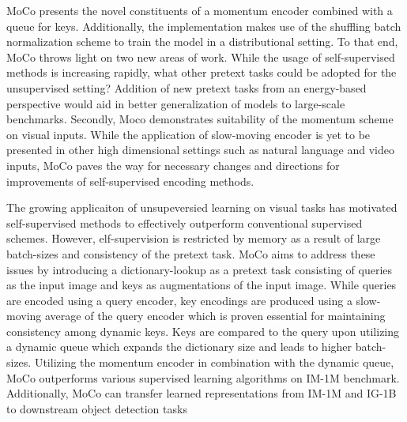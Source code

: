 \documentclass[10pt,letterpaper]{article}
\begin{document}
MoCo presents the novel constituents of a momentum encoder combined with a queue for keys. Additionally, the implementation makes use of the shuffling batch normalization scheme to train the model in a distributional setting. To that end, MoCo throws light on two new areas of work. While the usage of self-supervised methods is increasing rapidly, what other pretext tasks could be adopted for the unsupervised setting? Addition of new pretext tasks from an energy-based perspective would aid in better generalization of models to large-scale benchmarks. Secondly, Moco demonstrates suitability of the momentum scheme on visual inputs. While the application of slow-moving encoder is yet to be presented in other high dimensional settings such as natural language and video inputs, MoCo paves the way for necessary changes and directions for improvements of self-supervised encoding methods.

The growing applicaiton of unsupeversied learning on visual tasks has motivated self-supervised methods to effectively outperform conventional supervised schemes. However, elf-supervision is restricted by memory as a result of large batch-sizes and consistency of the pretext task. MoCo aims to address these issues by introducing a dictionary-lookup as a pretext task consisting of queries as the input image and keys as augmentations of the input image. While queries are encoded using a query encoder, key encodings are produced using a slow-moving average of the query encoder which is proven essential for maintaining consistency among dynamic keys. Keys are compared to the query upon utilizing a dynamic queue which expands the dictionary size and leads to higher batch-sizes. Utilizing the momentum encoder in combination with the dynamic queue, MoCo outperforms various supervised learning algorithms on IM-1M benchmark. Additionally, MoCo can transfer learned representations from IM-1M and IG-1B to downstream object detection tasks  
\end{document}
